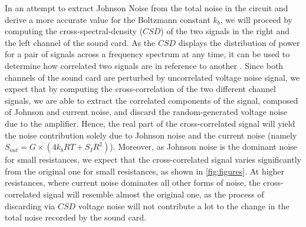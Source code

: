 \begin{linenumbers}
In an attempt to extract Johnson Noise from the total noise in the circuit and derive a more accurate value for the Boltzmann constant $k_b$, we will proceed by computing the cross-spectral-density ($CSD$) of the two signals in the right and the left channel of the sound card. As the $CSD$ displays the distribution of power for a pair of signals across a frequency spectrum at any time, it can be used to determine how correlated  two signals are in reference to another \cite{LARIVOIRE20171}. Since both channels of the sound card are perturbed by uncorrelated voltage noise signal, we expect that by computing the cross-correlation of the two different channel signals, we are able to extract the correlated components of the signal, composed of Johnson and current noise, and discard the random-generated voltage noise due to the amplifier. Hence, the real part of the cross-correlated signal will yield the noise contribution solely due to Johnson noise and the current noise (namely $S_{out} =G\times(4 k_bRT+ S_I R^2)$). Moreover, as Johnson noise is the dominant noise for small resistances, we expect that the cross-correlated signal varies significantly from the original one for small resistances, as shown in  \ref{fig:figures}. At higher resistances, where current noise dominates all other forms of noise, the cross-correlated signal will resemble almost the original one, as the process of discarding via $CSD$ voltage noise will not contribute a lot to the change in the total noise recorded by the sound card.


\end{linenumbers}

